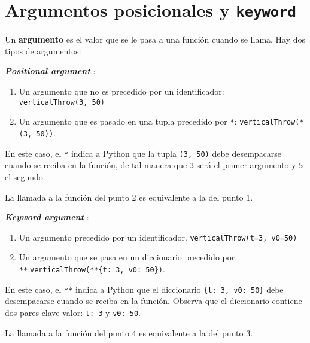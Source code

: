 \documentclass[
  letterpaper,
  DIV=11,
  numbers=noendperiod]{scrreprt}
\begin{document}

\chapter{\texorpdfstring{Argumentos posicionales y
\texttt{keyword}}{Argumentos posicionales y keyword}}\label{argumentos-posicionales-y-keyword}

Un \textbf{argumento} es el valor que se le pasa a una función cuando se
llama. Hay dos tipos de argumentos:

\textbf{\emph{Positional argument}} :

\begin{enumerate}
\def\labelenumi{\arabic{enumi}.}
\item
  Un argumento que no es precedido por un identificador:
  \texttt{verticalThrow(3,\ 50)}
\item
  Un argumento que es pasado en una tupla precedido por \texttt{*}:
  \texttt{verticalThrow(*(3,\ 50))}.
\end{enumerate}

En este caso, el \texttt{*} indica a Python que la tupla
\texttt{(3,\ 50)} debe desempacarse cuando se reciba en la función, de
tal manera que \texttt{3} será el primer argumento y \texttt{5} el
segundo.

La llamada a la función del punto 2 es equivalente a la del punto 1.

\textbf{\emph{Keyword argument}} :

\begin{enumerate}
\def\labelenumi{\arabic{enumi}.}
\setcounter{enumi}{2}
\item
  Un argumento precedido por un identificador.
  \texttt{verticalThrow(t=3,\ v0=50)}
\item
  Un argumento que se pasa en un diccionario precedido por
  \texttt{**}:\texttt{verticalThrow(**\{\textquotesingle{}t\textquotesingle{}:\ 3,\ \textquotesingle{}v0\textquotesingle{}:\ 50\})}.
\end{enumerate}

En este caso, el \texttt{**} indica a Python que el diccionario
\texttt{\{\textquotesingle{}t\textquotesingle{}:\ 3,\ \textquotesingle{}v0\textquotesingle{}:\ 50\}}
debe desempacarse cuando se reciba en la función. Observa que el
diccionario contiene dos pares clave-valor:
\texttt{\textquotesingle{}t\textquotesingle{}:\ 3} y
\texttt{\textquotesingle{}v0\textquotesingle{}:\ 50}.

La llamada a la función del punto 4 es equivalente a la del punto 3.
\end{document}
